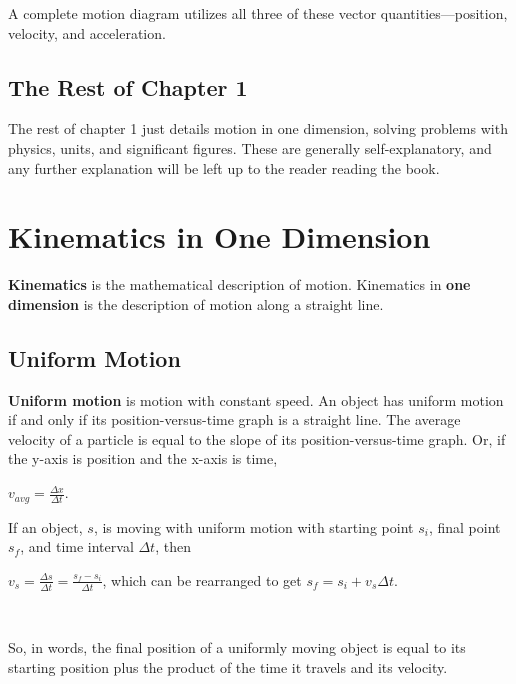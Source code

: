 \documentclass[12pt,letterpaper]{article}
\begin{document}
A complete motion diagram utilizes all three of these vector quantities---position, velocity, and acceleration.

\subsection[The Rest of Chapter 1]{The Rest of Chapter 1}

The rest of chapter 1 just details motion in one dimension, solving problems with physics, units, and significant figures. These are generally self-explanatory, and any further explanation will be left up to the reader reading the book.

\pagebreak

\section[Kinematics in One Dimension]{Kinematics in One Dimension}

\textbf{Kinematics} is the mathematical description of motion. Kinematics in \textbf{one dimension} is the description of motion along a straight line.

\subsection[Uniform Motion]{Uniform Motion}

\textbf{Uniform motion} is motion with constant speed. An object has uniform motion if and only if its position-versus-time graph is a straight line. The average velocity of a particle is equal to the slope of its position-versus-time graph. Or, if the y-axis is position and the x-axis is time,

\begin{center}
$v_{avg}=\frac{\Delta x}{\Delta t}$.
\end{center}

If an object, $s$, is moving with uniform motion with starting point $s_{i}$, final point $s_{f}$, and time interval $\Delta t$, then 

\begin{center}
$v_{s}=\frac{\Delta s}{\Delta t}=\frac{s_{f}-s_{i}}{\Delta t}$, which can be rearranged to get $s_{f}=s_{i}+v_{s}\Delta t$.
\end{center}\

So, in words, the final position of a uniformly moving object is equal to its starting position plus the product of the time it travels and its velocity.
\end{document}
